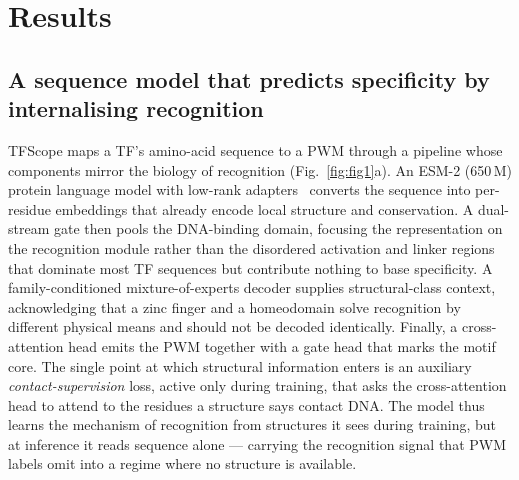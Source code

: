 \documentclass[11pt,letterpaper]{article}
\begin{document}
\section*{Results}

\subsection*{A sequence model that predicts specificity by internalising recognition}
TFScope maps a TF's amino-acid sequence to a PWM through a pipeline whose components mirror the
biology of recognition (Fig.~\ref{fig:fig1}a). An ESM-2 (650\,M) protein language model with
low-rank adapters~\cite{Lin2023,Hu2022} converts the sequence into per-residue embeddings that
already encode local structure and conservation. A dual-stream gate then pools the DNA-binding
domain, focusing the representation on the recognition module rather than the disordered
activation and linker regions that dominate most TF sequences but contribute nothing to base
specificity. A family-conditioned mixture-of-experts decoder supplies structural-class context,
acknowledging that a zinc finger and a homeodomain solve recognition by different physical means
and should not be decoded identically. Finally, a cross-attention head emits the PWM together
with a gate head that marks the motif core. The single point at which structural information
enters is an auxiliary \emph{contact-supervision} loss, active only during training, that asks
the cross-attention head to attend to the residues a structure says contact DNA. The model thus
learns the mechanism of recognition from structures it sees during training, but at inference it
reads sequence alone --- carrying the recognition signal that PWM labels omit into a regime where
no structure is available.
\end{document}
